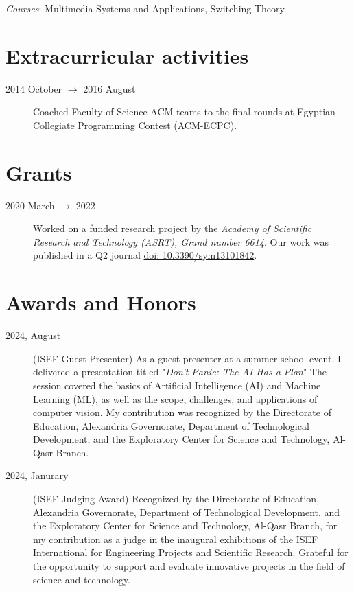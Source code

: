 \documentclass[margin,line]{resume}
\newcommand*{\doi}[1]{\href{http://dx.doi.org/#1}{doi: #1}}
\begin{document}
\begin{resume}
\begin{description}
			\emph{Courses}: Multimedia Systems and Applications, Switching Theory.

	\end{description}



	\section{\mysidestyle Extracurricular activities}\vspace{1mm}
	\begin{description}
		\item[2014 October $\rightarrow$ 2016 August] Coached Faculty of Science ACM teams to the final rounds at Egyptian Collegiate Programming Contest (ACM-ECPC).

	\end{description}

	\section{\mysidestyle Grants}
	\begin{description}
		\item[2020 March $\rightarrow$ 2022] Worked on a funded research project by the \textit{Academy of Scientific Research and Technology (ASRT), Grand number 6614}. Our work was published in a Q2 journal \doi{10.3390/sym13101842}.
	\end{description}

	\section{\mysidestyle Awards and Honors}
	\begin{description}
		\item [2024, August] (ISEF Guest Presenter) As a guest presenter at a summer school event, I delivered a presentation titled "\textit{Don't Panic: The AI Has a Plan}" The session covered the basics of Artificial Intelligence (AI) and Machine Learning (ML), as well as the scope, challenges, and applications of computer vision. My contribution was recognized by the Directorate of Education, Alexandria Governorate, Department of Technological Development, and the Exploratory Center for Science and Technology, Al-Qasr Branch.
		\item[2024, Janurary] (ISEF Judging Award) Recognized by the Directorate of Education, Alexandria Governorate, Department of Technological Development, and the Exploratory Center for Science and Technology, Al-Qasr Branch, for my contribution as a judge in the inaugural exhibitions of the ISEF International for Engineering Projects and Scientific Research. Grateful for the opportunity to support and evaluate innovative projects in the field of science and technology.
	\end{description}



\end{resume}
\end{document}
